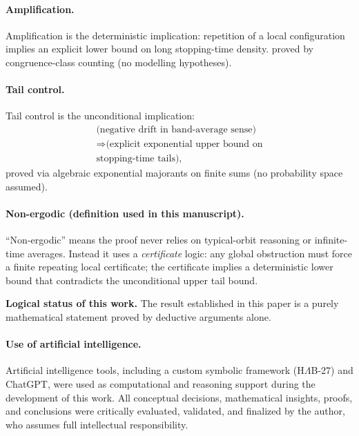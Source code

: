\documentclass[preprint,12pt]{elsarticle}
\begin{document}
\paragraph{Amplification.}
Amplification is the deterministic implication:
repetition of a local configuration implies an explicit lower bound on long
stopping-time density.
proved by congruence-class counting (no modelling hypotheses).

\paragraph{Tail control.}
Tail control is the unconditional implication:
\[
\begin{gathered}
\text{(negative drift in band-average sense)} \\
\Rightarrow \text{(explicit exponential upper bound on} \\
\text{stopping-time tails)},
\end{gathered}
\]
proved via algebraic exponential majorants on finite sums (no probability space assumed).

\paragraph{Non-ergodic (definition used in this manuscript).}
“Non-ergodic” means the proof never relies on typical-orbit reasoning or infinite-time averages.
Instead it uses a \emph{certificate} logic:
any global obstruction must force a finite repeating local certificate;
the certificate implies a deterministic lower bound that contradicts the unconditional upper tail bound.

\noindent\textbf{Logical status of this work.}
The result established in this paper is a purely mathematical statement proved by deductive arguments alone.

\paragraph{Use of artificial intelligence.}
Artificial intelligence tools, including a custom symbolic framework
(H$\Lambda$B-27) and ChatGPT, were used as computational and reasoning 
support during the development of this work.
All conceptual decisions, mathematical insights, proofs, and conclusions
were critically evaluated, validated, and finalized by the author, who
assumes full intellectual responsibility.
\end{document}
